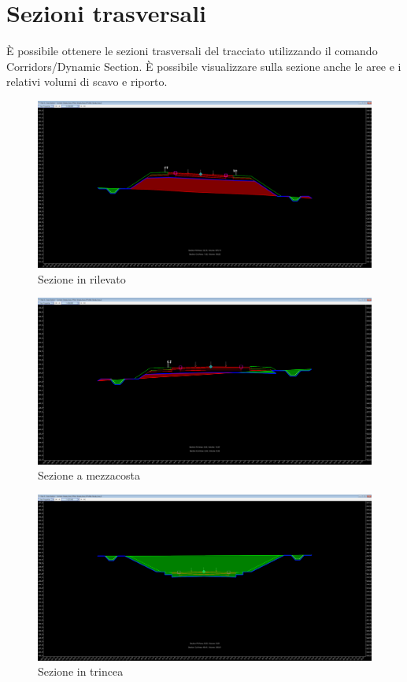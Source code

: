 \chapter{Sezioni trasversali}

È possibile ottenere le sezioni trasversali del tracciato utilizzando il comando Corridors/Dynamic Section. È possibile visualizzare sulla sezione anche le aree e i relativi volumi di scavo e riporto.

\begin{figure}[H]
    \includegraphics[width=\textwidth]{Figures/Sezione in rilevato.png}
      \caption{Sezione in rilevato}
      \label{Sezione in rilevato}
\end{figure}

\begin{figure}[H]
    \includegraphics[width=\textwidth]{Figures/Sezione a mezzacosta.png}
      \caption{Sezione a mezzacosta}
      \label{Sezione a mezzacosta}
\end{figure}

\begin{figure}[H]
    \includegraphics[width=\textwidth]{Figures/sezione in trincea.png}
      \caption{Sezione in trincea}
      \label{sezione in trincea}
\end{figure}

